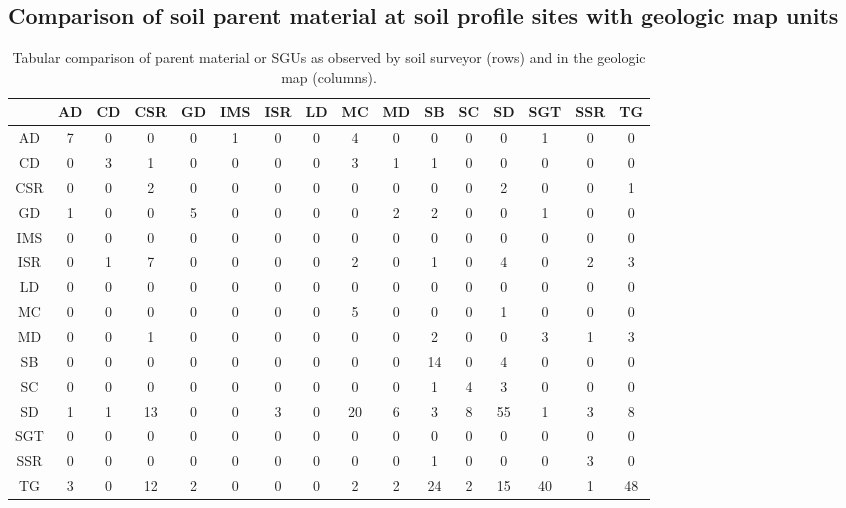 \documentclass[preprint,12pt,authoryear]{elsarticle}
\begin{document}
\subsection{Comparison of soil parent material at soil profile sites with geologic map units}
\begin{table}[ht]
\centering
\tabcolsep=0.10cm
\begin{tabular}{cccccccccccccccc}
  \hline
 & AD & CD & CSR & GD & IMS & ISR & LD & MC & MD & SB & SC & SD & SGT & SSR & TG \\ 
  \hline
AD &   7 &   0 &   0 &   0 &   1 &   0 &   0 &   4 &   0 &   0 &   0 &   0 &   1 &   0 &   0 \\ 
  CD &   0 &   3 &   1 &   0 &   0 &   0 &   0 &   3 &   1 &   1 &   0 &   0 &   0 &   0 &   0 \\ 
  CSR &   0 &   0 &   2 &   0 &   0 &   0 &   0 &   0 &   0 &   0 &   0 &   2 &   0 &   0 &   1 \\ 
  GD &   1 &   0 &   0 &   5 &   0 &   0 &   0 &   0 &   2 &   2 &   0 &   0 &   1 &   0 &   0 \\ 
  IMS &   0 &   0 &   0 &   0 &   0 &   0 &   0 &   0 &   0 &   0 &   0 &   0 &   0 &   0 &   0 \\ 
  ISR &   0 &   1 &   7 &   0 &   0 &   0 &   0 &   2 &   0 &   1 &   0 &   4 &   0 &   2 &   3 \\ 
  LD &   0 &   0 &   0 &   0 &   0 &   0 &   0 &   0 &   0 &   0 &   0 &   0 &   0 &   0 &   0 \\ 
  MC &   0 &   0 &   0 &   0 &   0 &   0 &   0 &   5 &   0 &   0 &   0 &   1 &   0 &   0 &   0 \\ 
  MD &   0 &   0 &   1 &   0 &   0 &   0 &   0 &   0 &   0 &   2 &   0 &   0 &   3 &   1 &   3 \\ 
  SB &   0 &   0 &   0 &   0 &   0 &   0 &   0 &   0 &   0 &  14 &   0 &   4 &   0 &   0 &   0 \\ 
  SC &   0 &   0 &   0 &   0 &   0 &   0 &   0 &   0 &   0 &   1 &   4 &   3 &   0 &   0 &   0 \\ 
  SD &   1 &   1 &  13 &   0 &   0 &   3 &   0 &  20 &   6 &   3 &   8 &  55 &   1 &   3 &   8 \\ 
  SGT &   0 &   0 &   0 &   0 &   0 &   0 &   0 &   0 &   0 &   0 &   0 &   0 &   0 &   0 &   0 \\ 
  SSR &   0 &   0 &   0 &   0 &   0 &   0 &   0 &   0 &   0 &   1 &   0 &   0 &   0 &   3 &   0 \\ 
  TG &   3 &   0 &  12 &   2 &   0 &   0 &   0 &   2 &   2 &  24 &   2 &  15 &  40 &   1 &  48 \\ 
   \hline
\end{tabular}
\caption{Tabular comparison of parent material or SGUs as observed by soil surveyor (rows) and in the geologic map (columns).} 
\label{kartiergegenkarte}
\end{table}
\end{document}
